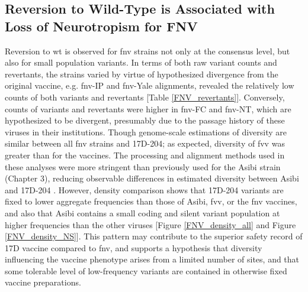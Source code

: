 \subsection{Reversion to Wild-Type is Associated with Loss of Neurotropism for FNV}
Reversion to \gls{wt} is observed for \gls{fnv} strains not only at the consensus level, but also for small population variants. In terms of both raw variant counts and revertants, the strains varied by virtue of hypothesized divergence from the original vaccine, e.g. \gls{fnv}-IP and \gls{fnv}-Yale alignments, revealed the relatively low counts of both variants and revertants [Table \ref{FNV_revertants}]. Conversely, counts of variants and revertants were higher in \gls{fnv}-FC and \gls{fnv}-NT, which are hypothesized to be divergent, presumably due to the passage history of these viruses in their institutions. Though genome-scale estimations of diversity are similar between all \gls{fnv} strains and 17D-204; as expected, diversity of \gls{fvv} was greater than for the vaccines. The processing and alignment methods used in these analyses were more stringent than previously used for the Asibi strain (Chapter 3), reducing observable differences in estimated diversity between Asibi and 17D-204 \parencite{Beck:2014cm}. However, density comparison shows that 17D-204 variants are fixed to lower aggregate frequencies than those of Asibi, \gls{fvv}, or the \gls{fnv} vaccines, and also that Asibi contains a small coding and silent variant population at higher frequencies than the other viruses [Figure \ref{FNV_density_all} and Figure \ref{FNV_density_NS}]. This pattern may contribute to the superior safety record of 17D vaccine compared to \gls{fnv}, and supports a hypothesis that diversity influencing the vaccine phenotype arises from a limited number of sites, and that some tolerable level of low-frequency variants are contained in otherwise fixed vaccine preparations.

